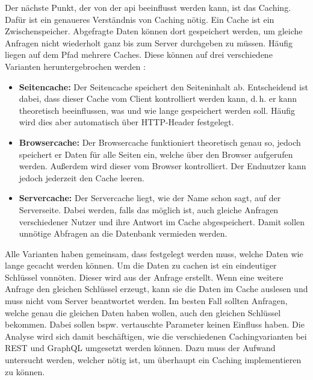 Der nächste Punkt, der von der \ac{api} beeinflusst werden kann, ist das Caching. Dafür ist ein genaueres Verständnis von Caching nötig. Ein Cache ist ein Zwischenspeicher. Abgefragte Daten können dort gespeichert werden, um gleiche Anfragen nicht wiederholt ganz bis zum Server durchgeben zu müssen. Häufig liegen auf dem Pfad mehrere Caches. Diese können auf drei verschiedene Varianten heruntergebrochen werden \parencite{McKinnon2019}:

\begin{itemize}
\item \textbf{Seitencache:} Der Seitencache speichert den Seiteninhalt ab. Entscheidend ist dabei, dass dieser Cache vom Client kontrolliert werden kann, d.\,h. er kann theoretisch beeinflussen, was und wie lange gespeichert werden soll. Häufig wird dies aber automatisch über HTTP-Header festgelegt.
\item \textbf{Browsercache:} Der Browsercache funktioniert theoretisch genau so, jedoch speichert er Daten für alle Seiten ein, welche über den Browser aufgerufen werden. Außerdem wird dieser vom Browser kontrolliert. Der Endnutzer kann jedoch jederzeit den Cache leeren.
\item \textbf{Servercache:} Der Servercache liegt, wie der Name schon sagt, auf der Serverseite. Dabei werden, falls das möglich ist, auch gleiche Anfragen verschiedener Nutzer und ihre Antwort im Cache abgespeichert. Damit sollen unnötige Abfragen an die Datenbank vermieden werden.
\end{itemize}

Alle Varianten haben gemeinsam, dass festgelegt werden muss, welche Daten wie lange gecacht werden können. Um die Daten zu cachen ist ein eindeutiger Schlüssel vonnöten. Dieser wird aus der Anfrage erstellt. Wenn eine weitere Anfrage den gleichen Schlüssel erzeugt, kann sie die Daten im Cache auslesen und muss nicht vom Server beantwortet werden. Im besten Fall sollten Anfragen, welche genau die gleichen Daten haben wollen, auch den gleichen Schlüssel bekommen. Dabei sollen bspw. vertauschte Parameter keinen Einfluss haben. Die Analyse wird sich damit beschäftigen, wie die verschiedenen Cachingvarianten bei \ac{REST} und GraphQL umgesetzt werden können. Dazu muss der Aufwand untersucht werden, welcher nötig ist, um überhaupt ein Caching implementieren zu können.\\
\\